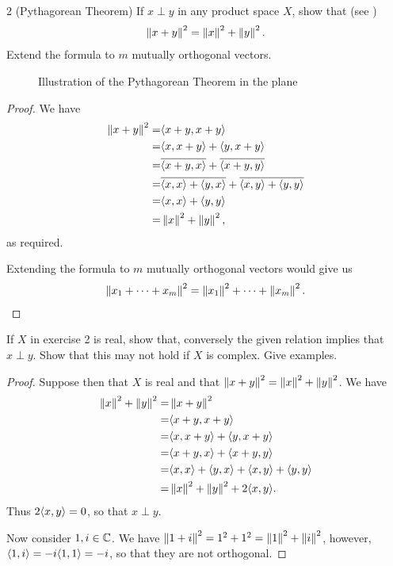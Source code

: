 \begin{exercise}{2 (Pythagorean Theorem)}
If $x\perp y$ in any product space $X$, show that (see )
\begin{align*}
    \left\lVert x+y\right\rVert^2 = \left\lVert x\right\rVert^2 + \left\lVert y\right\rVert^2.
\end{align*}
Extend the formula to $m$ mutually orthogonal vectors.

\begin{figure}[H]
    \centering
    
    \caption{Illustration of the Pythagorean Theorem in the plane}
    \label{fig:sec3-1-ex2}
\end{figure}

\end{exercise}
\begin{proof}
We have
\begin{align*}
    \left\lVert x+y\right\rVert^2
    =& \langle x+y, x+y\rangle\\
    =& \langle x, x+y\rangle + \langle y, x+y\rangle\\
    =& \overline{\langle x+y, x\rangle} + \overline{\langle x+y,y\rangle}\\
    =& \overline{\langle x, x\rangle + \langle y, x\rangle} + \overline{\langle x,y\rangle + \langle y,y\rangle}\\
    =& \langle x, x\rangle + \langle y,y\rangle\\
    =& \left\lVert x\right\rVert^2 +\left\lVert y\right\rVert^2,
\end{align*}
as required.

Extending the formula to $m$ mutually orthogonal vectors would give us
\begin{align*}
    \left\lVert x_1+\dots+x_m\right\rVert^2
    = \left\lVert x_1\right\rVert^2 + \dots + \left\lVert x_m\right\rVert^2.
\end{align*}
\end{proof}

\begin{exercise}{3}
If $X$ in exercise 2 is real, show that, conversely the given relation implies that $x\perp y$. 
Show that this may not hold if $X$ is complex. Give examples.
\end{exercise}
\begin{proof}
Suppose then that $X$ is real and that $\left\lVert x+y\right\rVert^2 = \left\lVert x\right\rVert^2 + \left\lVert y\right\rVert^2$.
We have
\begin{align*}
    \left\lVert x\right\rVert^2 + \left\lVert y\right\rVert^2
    =& \left\lVert x+y\right\rVert^2\\
    =& \langle x+y, x+y\rangle\\
    =& \langle x, x+y\rangle + \langle y, x+y\rangle\\
    =& \langle x+y, x\rangle + \langle x+y,y\rangle\\
    =& \langle x, x\rangle + \langle y, x\rangle 
    + \langle x,y\rangle + \langle y,y\rangle\\
    =& \left\lVert x\right\rVert^2 + \left\lVert y\right\rVert^2 + 2\langle x,y\rangle.
\end{align*}
Thus $2\langle x,y\rangle=0$, so that $x\perp y$.

Now consider $1,i\in\mathbb{C}$. 
We have $\left\lVert 1+i\right\rVert^2 = 1^2 + 1^2 = \left\lVert 1\right\rVert^2 + \left\lVert i\right\rVert^2$, however, $\langle 1,i\rangle = -i\langle 1,1\rangle = -i$, so that they are not orthogonal.
\end{proof}

